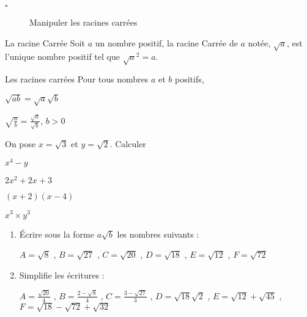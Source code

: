 \begin{titre}

\end{titre}

\begin{CpsCol}
\begin{description}
\item[$\square$] Manipuler les racines carrées
\end{description}
\end{CpsCol}

\begin{DefT}{La racine Carrée}
 Soit $a$ un nombre positif, la racine Carrée de $a$ notée, $\sqrt{a}$, est l'unique nombre positif tel que $\sqrt{a}^2=a$.
\end{DefT}  


\begin{ThT}{Les racines carrées}
Pour tous nombres $a$ et $b$ positifs, 
\begin{description}
\item $\sqrt{ab}=\sqrt{a}\sqrt{b}$
\item $\sqrt{\frac{a}{b}}=\frac{\sqrt{a}}{\sqrt{b}}$, $b >0$
\end{description}
\end{ThT}


On pose $x = \sqrt{3}$ et $y=\sqrt{2}$. Calculer

\begin{enumerate}
\begin{minipage}{0.5\linewidth}
\item $x^4-y$
\item $2x^2+2x+3$
\end{minipage}
\begin{minipage}{0.5\linewidth}
\item $(x+2)(x-4)$
\item $x^3 \times y^3$
\end{minipage}
\end{enumerate}


\begin{enumerate}
\item Écrire sous la forme $a\sqrt{b}$ les nombres suivants :

$A = \sqrt{8}$ , $B=\sqrt{27}$ , $C=\sqrt{20}$  , $D=\sqrt{18}$  , $E=\sqrt{12}$  , $F=\sqrt{72}$
\item Simplifie les écritures :

$A=\frac{\sqrt{20}}{4}$ , $B = \frac{2-\sqrt{8}}{4}$ , $C=\frac{3-\sqrt{27}}{3}$ , $D=\sqrt{18}\sqrt{2}$  , $E=\sqrt{12}+\sqrt{45}$  , $F=\sqrt{18} -\sqrt{72} +\sqrt{32}$

\end{enumerate}

